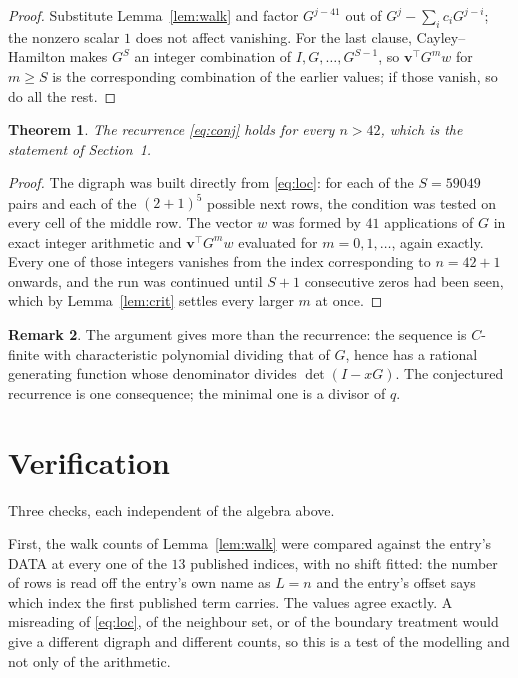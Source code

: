 \documentclass[11pt,a4paper]{article}
\theoremstyle{plain}
\newtheorem{theorem}{Theorem}
\theoremstyle{definition}
\newtheorem{remark}[theorem]{Remark}
\begin{document}
\begin{proof}
Substitute Lemma~\ref{lem:walk} and factor $G^{j-41}$ out of
$G^{j}-\sum_ic_iG^{j-i}$; the nonzero scalar $1$ does not affect
vanishing. For the last clause, Cayley--Hamilton makes $G^{S}$ an integer combination of
$I,G,\dots,G^{S-1}$, so $\mathbf{v}^{\!\top}G^{m}w$ for $m\ge S$ is the corresponding
combination of the earlier values; if those vanish, so do all the rest.
\end{proof}

\begin{theorem}
The recurrence \eqref{eq:conj} holds for every $n>42$, which is the statement of
Section~1.
\end{theorem}

\begin{proof}
The digraph was built directly from \eqref{eq:loc}: for each of the $S=59049$ pairs and each
of the $(2+1)^{5}$ possible next rows, the condition was tested on every cell of
the middle row. The vector $w$ was formed by $41$ applications of $G$ in exact integer
arithmetic and $\mathbf{v}^{\!\top}G^{m}w$ evaluated for $m=0,1,\dots$, again exactly.
Every one of those integers vanishes from the index corresponding to $n=42+1$ onwards,
and the run was continued until $S+1$ consecutive zeros had been seen, which by
Lemma~\ref{lem:crit} settles every larger $m$ at once.
\end{proof}

\begin{remark}
The argument gives more than the recurrence: the sequence is $C$-finite with characteristic
polynomial dividing that of $G$, hence has a rational generating function whose denominator
divides $\det(I-xG)$. The conjectured recurrence is one consequence; the minimal one is a
divisor of $q$.
\end{remark}

\section{Verification}

Three checks, each independent of the algebra above.

First, the walk counts of Lemma~\ref{lem:walk} were compared against the entry's DATA at
every one of the $13$ published indices, with no shift fitted: the number of rows is
read off the entry's own name as $L=n$ and the entry's offset says which index the first
published term carries. The values agree exactly. A misreading of \eqref{eq:loc}, of the
neighbour set, or of the boundary treatment would give a different digraph and different
counts, so this is a test of the modelling and not only of the arithmetic.
\end{document}
